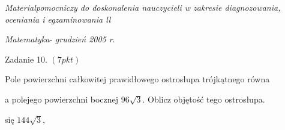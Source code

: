 \documentclass[a4paper,12pt]{article}
\begin{document}
{\it Materialpomocniczy do doskonalenia nauczycieli w zakresie diagnozowania, oceniania i egzaminowania ll}

{\it Matematyka}- {\it grudzień 2005 r}.

Zadanie 10. $(7pkt)$

Pole powierzchni całkowitej prawidłowego ostrosłupa trójkątnego równa

a polejego powierzchni bocznej $96\sqrt{3}$. Oblicz objętość tego ostrosłupa.

się $144\sqrt{3},$
\end{document}
